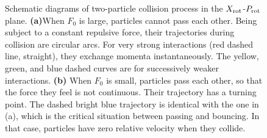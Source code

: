 \documentclass[aps,preprintnumbers,onecolumn,amsmath,amssymb,floatfix,pra]{revtex4-1}
\begin{document}
\begin{figure}[h
]
\caption{Schematic diagrams of two-particle collision process in the $X_{\rm rot}$-$P_{\rm rot}$
  plane. \textbf{(a)}When $F_0$ is large, particles cannot pass each other.  Being subject to a
  constant repulsive force, their trajectories during collision are circular arcs.  For very strong
  interactions (red dashed line, straight), they exchange momenta instantaneously.  The yellow,
  green, and blue dashed curves are for successively weaker interactions.  \textbf{(b)} When $F_0$
  is small, particles pass each other, so that the force they feel is not continuous.  Their
  trajectory has a turning point. The dashed bright blue trajectory is identical with the one in
  (a), which is the critical situation between passing and bouncing. In that case, particles have
  zero relative velocity when they collide. }
\label{fig:Breathingfrequency3}
\end{figure}
\end{document}
